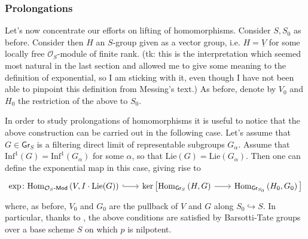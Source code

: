 \documentclass[../Main]{subfiles}
\begin{document}
\subsubsection{Prolongations}
Let's now concentrate our efforts on lifting of homomorphisms.
Consider $S, S_0$ as before.
Consider then $H$ an $S$-group given as a vector group,
i.e. $H = \underline{V}$ for some locally free $\mathcal{O}_{ S }$-module
of finite rank.
(tk: this is the interpretation which seemed most natural in the last
section and allowed me to give some meaning to the definition of exponential,
so I am sticking with it, even though I have not been able to pinpoint
this definition from Messing's text.)
As before, denote by $V_0$ and $H_0$ the restriction of the above to $S_0$.


\begin{rem}
	In order to study prolongations of homomorphisms it is useful to notice that
	the above construction can be carried out in the following case.
	Let's assume that $G \in \mathsf{Gr}_S$ is a filtering direct limit of
	representable subgroups $G_\alpha$.
	Assume that $\mathrm{Inf}^1(G) = \mathrm{Inf}^1(G_\alpha)$ for some $\alpha$,
	so that $\mathrm{Lie}(G) = \mathrm{Lie}(G_\alpha)$.
	Then one can define the exponential map in this case, giving rise to
	\begin{equation*}
	\begin{tikzcd}[row sep = 0ex, column sep = 2.0em
		,/tikz/column 1/.append style={anchor=base east}
		,/tikz/column 2/.append style={anchor=base west}]
		\exp\colon
		\mathrm{Hom}_{ \mathcal{O}_{ S }\text{-}\mathsf{Mod} }
		\left( V, I \cdot \mathrm{Lie}(G) \right)
		\arrow[r, "", hookrightarrow] &
		\ker \big[ 
		\mathrm{Hom}_{ \mathsf{Gr}_S } 
		\left( H, G \right)
		\arrow[r, "", rightarrow] &
		\mathrm{Hom}_{ \mathsf{Gr}_{S_0} }
		\left( H_0, G_0 \right)
		\big]
	\end{tikzcd}
	\end{equation*} 
	where, as before, $V_0$ and $G_0$ are the pullback of $V$ and $G$ 
	along $S_0 \hookrightarrow S$.
	In particular, thanks to \cite[Chapter II, Corollary 3.3.16]{Messing},
	the above conditions are satisfied by Barsotti-Tate
	groups over a base scheme $S$ on which $p$ is nilpotent.
\end{rem}
\end{document}
